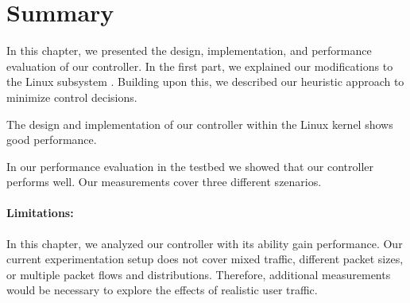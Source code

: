 \section{Summary}
\label{sec:controller:conclusion}

In this chapter, we presented the design, implementation, and performance evaluation of our controller. 
%
In the first part, we explained our modifications to the Linux subsystem .
%
Building upon this, we described our heuristic approach to minimize control decisions.
%

%
The design and implementation of our controller within the Linux kernel shows good performance.
%

In our performance evaluation in the testbed we showed that our controller performs well.
%
Our measurements cover three different szenarios.

\paragraph{Limitations:}

In this chapter, we analyzed our controller with its ability gain performance.
%
Our current experimentation setup does not cover mixed traffic, different packet sizes, or multiple packet flows and distributions.
%
Therefore, additional measurements would be necessary to explore the effects of realistic user traffic.
%
